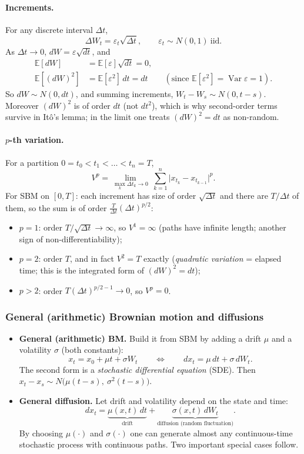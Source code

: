 \paragraph{Increments.} For any discrete interval $\Delta t$,
\[
\Delta W_t=\varepsilon_t\sqrt{\Delta t},\qquad \varepsilon_t\sim N(0,1)\ \text{iid}.
\]
As $\Delta t\to0$, $dW=\varepsilon\sqrt{dt}$, and
\begin{align*}
\mathbb{E}[dW]&=\mathbb{E}[\varepsilon]\sqrt{dt}=0,\\
\mathbb{E}[(dW)^2]&=\mathbb{E}[\varepsilon^2]\,dt=dt\qquad(\text{since }\mathbb{E}[\varepsilon^2]=\operatorname{Var}\varepsilon=1).
\end{align*}
So $dW\sim N(0,dt)$, and summing increments, $W_t-W_s\sim N(0,t-s)$. Moreover $(dW)^2$ is of order $dt$ (not $dt^2$), which is why second-order terms survive in It\^o's lemma; in the limit one treats $(dW)^2=dt$ as non-random.

\paragraph{$p$-th variation.} For a partition $0=t_0<t_1<\dots<t_n=T$,
\[
V^p=\lim_{\max_k\Delta t_k\to0}\ \sum_{k=1}^n\big|x_{t_k}-x_{t_{k-1}}\big|^p.
\]
For SBM on $[0,T]$: each increment has size of order $\sqrt{\Delta t}$ and there are $T/\Delta t$ of them, so the sum is of order $\frac{T}{\Delta t}(\Delta t)^{p/2}$:
\begin{itemize}
\item $p=1$: order $T/\sqrt{\Delta t}\to\infty$, so $V^1=\infty$ (paths have infinite length; another sign of non-differentiability);
\item $p=2$: order $T$, and in fact $V^2=T$ exactly (\emph{quadratic variation} = elapsed time; this is the integrated form of $(dW)^2=dt$);
\item $p>2$: order $T(\Delta t)^{p/2-1}\to0$, so $V^p=0$.
\end{itemize}

\subsubsection{General (arithmetic) Brownian motion and diffusions}\label{sec:diffusions}
\begin{itemize}
\item \textbf{General (arithmetic) BM.} Build it from SBM by adding a drift $\mu$ and a volatility $\sigma$ (both constants):
\[
x_t=x_0+\mu t+\sigma W_t\qquad\Longleftrightarrow\qquad dx_t=\mu\,dt+\sigma\,dW_t.
\]
The second form is a \emph{stochastic differential equation} (SDE). Then $x_t-x_s\sim N\big(\mu(t-s),\ \sigma^2(t-s)\big)$.
\item \textbf{General diffusion.} Let drift and volatility depend on the state and time:
\[
dx_t=\underbrace{\mu(x,t)\,dt}_{\text{drift}}+\underbrace{\sigma(x,t)\,dW_t}_{\text{diffusion (random fluctuation)}}.
\]
By choosing $\mu(\cdot)$ and $\sigma(\cdot)$ one can generate almost any continuous-time stochastic process with continuous paths. Two important special cases follow.
\end{itemize}

